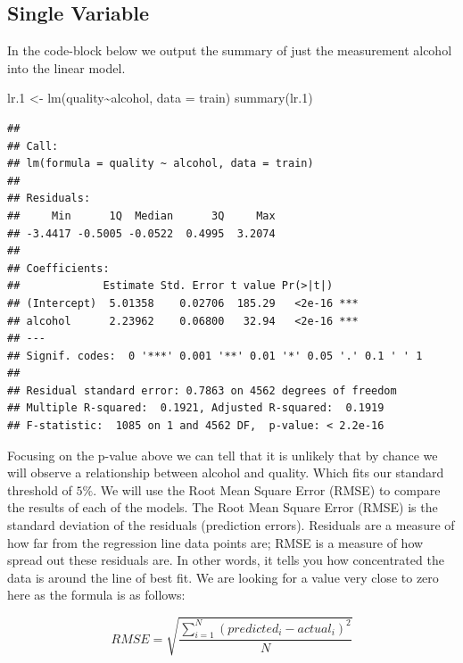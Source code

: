 \documentclass[
]{book}
\newenvironment{Shaded}{\begin{snugshade}}{\end{snugshade}}
\newcommand{\AttributeTok}[1]{\textcolor[rgb]{0.77,0.63,0.00}{#1}}
\newcommand{\FloatTok}[1]{\textcolor[rgb]{0.00,0.00,0.81}{#1}}
\newcommand{\FunctionTok}[1]{\textcolor[rgb]{0.00,0.00,0.00}{#1}}
\newcommand{\NormalTok}[1]{#1}
\newcommand{\OtherTok}[1]{\textcolor[rgb]{0.56,0.35,0.01}{#1}}
\newcommand{\SpecialCharTok}[1]{\textcolor[rgb]{0.00,0.00,0.00}{#1}}
\begin{document}
\hypertarget{single-variable}{%
\subsection{Single Variable}\label{single-variable}}

In the code-block below we output the summary of just the measurement alcohol into the linear model.

\begin{Shaded}
\begin{Highlighting}[]
\NormalTok{lr}\FloatTok{.1} \OtherTok{\textless{}{-}} \FunctionTok{lm}\NormalTok{(quality}\SpecialCharTok{\textasciitilde{}}\NormalTok{alcohol, }\AttributeTok{data =}\NormalTok{ train)}
\FunctionTok{summary}\NormalTok{(lr}\FloatTok{.1}\NormalTok{)}
\end{Highlighting}
\end{Shaded}

\begin{verbatim}
## 
## Call:
## lm(formula = quality ~ alcohol, data = train)
## 
## Residuals:
##     Min      1Q  Median      3Q     Max 
## -3.4417 -0.5005 -0.0522  0.4995  3.2074 
## 
## Coefficients:
##             Estimate Std. Error t value Pr(>|t|)    
## (Intercept)  5.01358    0.02706  185.29   <2e-16 ***
## alcohol      2.23962    0.06800   32.94   <2e-16 ***
## ---
## Signif. codes:  0 '***' 0.001 '**' 0.01 '*' 0.05 '.' 0.1 ' ' 1
## 
## Residual standard error: 0.7863 on 4562 degrees of freedom
## Multiple R-squared:  0.1921, Adjusted R-squared:  0.1919 
## F-statistic:  1085 on 1 and 4562 DF,  p-value: < 2.2e-16
\end{verbatim}

Focusing on the p-value above we can tell that it is unlikely that by chance we will observe a relationship between alcohol and quality. Which fits our standard threshold of \(5\%\).
We will use the Root Mean Square Error (RMSE) to compare the results of each of the models. \citet{RMSE} The Root Mean Square Error (RMSE) is the standard deviation of the residuals (prediction errors). Residuals are a measure of how far from the regression line data points are; RMSE is a measure of how spread out these residuals are. In other words, it tells you how concentrated the data is around the line of best fit. We are looking for a value very close to zero here as the formula is as follows:

\[RMSE = \sqrt{\frac{\sum_{i=1}^{N}(predicted_i - actual_i)^2}{N}}\]

\begin{Shaded}
\end{Shaded}
\end{document}
